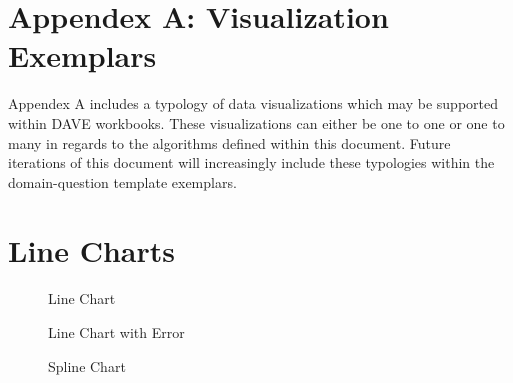\documentclass[../main.tex]{subfiles}
\begin{document}
\section*{Appendex A: Visualization Exemplars}

Appendex A includes a typology of data visualizations which may be supported within DAVE workbooks.
These visualizations can either be one to one or one to many in regards to the algorithms defined within this document.
Future iterations of this document will increasingly include these typologies within the domain-question template exemplars.

\section*{Line Charts}

\begin{figure*}[h]
  \centering
  {\caption{Line Chart}
    \label{fig1}}
  {}
\end{figure*}

\begin{figure*}[h]
  \centering
  {\caption {Line Chart with Error}
    \label{fig2}}
  {}
\end{figure*}

\begin{figure*}[h]
  \centering
  {\caption{Spline Chart}
    \label{fig3}}
  {}
\end{figure*}
\end{document}
